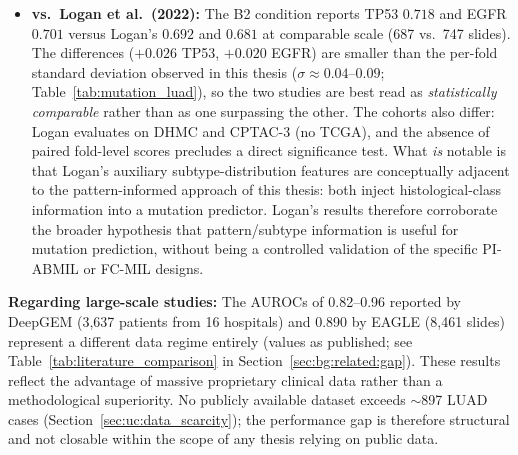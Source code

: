 \begin{itemize}
    \item \textbf{vs.\ Logan et al.\ (2022):} The B2 condition
    reports TP53 $0.718$ and EGFR $0.701$ versus Logan's $0.692$
    and $0.681$ at comparable scale (687 vs.\ 747 slides).
    The differences ($+0.026$ TP53, $+0.020$ EGFR) are smaller than
    the per-fold standard deviation observed in this thesis
    ($\sigma \approx 0.04$--$0.09$;
    Table~\ref{tab:mutation_luad}), so the two studies are best
    read as \emph{statistically comparable} rather than as one
    surpassing the other.
    The cohorts also differ: Logan evaluates on DHMC and CPTAC-3
    (no TCGA), and the absence of paired fold-level scores
    precludes a direct significance test.
    What \emph{is} notable is that Logan's auxiliary
    subtype-distribution features are conceptually adjacent to the
    pattern-informed approach of this thesis: both inject
    histological-class information into a mutation predictor.
    Logan's results therefore corroborate the broader hypothesis
    that pattern/subtype information is useful for mutation
    prediction, without being a controlled validation of the
    specific PI-ABMIL or FC-MIL designs.
\end{itemize}

\textbf{Regarding large-scale studies:}
The AUROCs of 0.82--0.96 reported by DeepGEM (3,637 patients from 16
hospitals) and 0.890 by EAGLE (8,461 slides) represent a different
data regime entirely (values as published; see
Table~\ref{tab:literature_comparison} in
Section~\ref{sec:bg:related:gap}).
These results reflect the advantage of massive proprietary clinical data
rather than a methodological superiority.
No publicly available dataset exceeds $\sim$897 LUAD cases
(Section~\ref{sec:uc:data_scarcity}); the performance gap is therefore
structural and not closable within the scope of any thesis relying on
public data.


%
%



